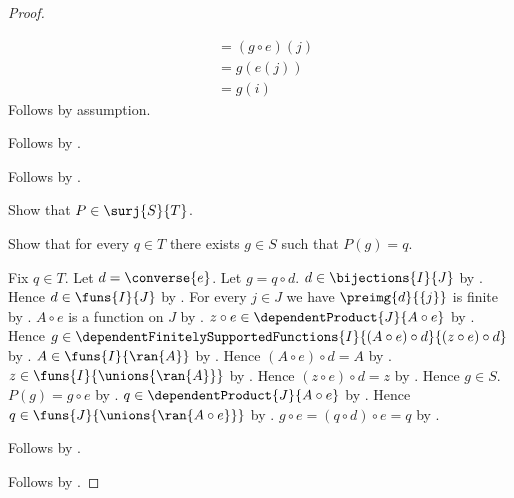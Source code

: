 \begin{proof}
\begin{subproof}
\begin{subproof}
\begin{subproof}
\begin{align*}
                        &= (g\circ e)(j)
                        \\
                        &= g(e(j))
                        \\
                        &= g(i)
                \end{align*}
                Follows by assumption.
            \end{subproof}
            Follows by
                .
        \end{subproof}
        Follows by .
    \end{subproof}
    Show that $P\in\surj{S}{T}$.
    \begin{subproof}
        Show that for every $q\in T$ there exists $g\in S$ such that
            $P(g)=q$.
        \begin{subproof}
            Fix $q\in T$.
            Let $d=\converse{e}$.
            Let $g=q\circ d$.
            $d\in\bijections{I}{J}$ by
                .
            Hence $d\in\funs{I}{J}$ by .
            For every $j\in J$ we have $\preimg{d}{\{j\}}$ is finite by
                .
            $A\circ e$ is a function on $J$ by
                .
            $z\circ e\in\dependentProduct{J}{A\circ e}$ by
                .
            Hence
                $g\in\dependentFinitelySupportedFunctions
                    {I}{(A\circ e)\circ d}{(z\circ e)\circ d}$ by
                .
            $A\in\funs{I}{\ran{A}}$ by
                .
            Hence $(A\circ e)\circ d=A$ by
                .
            $z\in\funs{I}{\unions{\ran{A}}}$ by
                .
            Hence $(z\circ e)\circ d=z$ by
                .
            Hence $g\in S$.
            $P(g)=g\circ e$ by
                .
            $q\in\dependentProduct{J}{A\circ e}$ by
                .
            Hence $q\in\funs{J}{\unions{\ran{A\circ e}}}$ by
                .
            $g\circ e=(q\circ d)\circ e=q$ by
                .
        \end{subproof}
        Follows by .
    \end{subproof}
    Follows by .
\end{proof}

